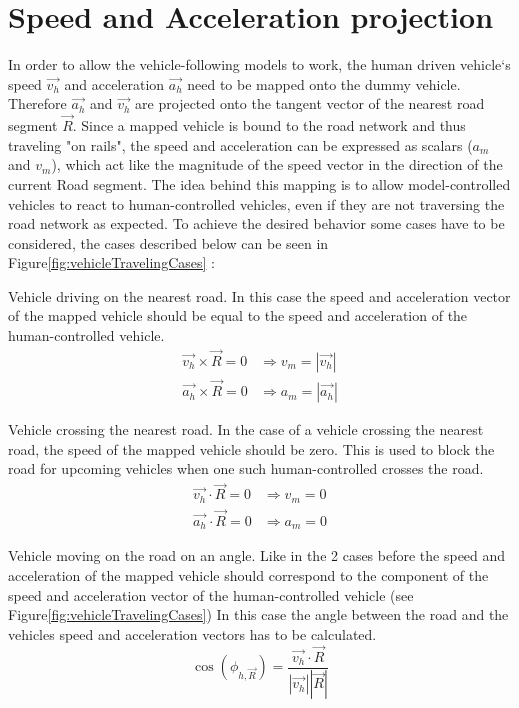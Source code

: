 \section{Speed and Acceleration projection}\label{sec:speed-and-acceleration-projection}
    In order to allow the vehicle-following models to work, the human driven vehicle`s speed $\vec{v_h}$ and acceleration $\vec{a_h}$ need to be mapped onto the dummy vehicle.
    Therefore $\vec{a_h}$ and $\vec{v_h}$ are projected onto the tangent vector of the nearest road segment $\vec{R}$.
    Since a mapped vehicle is bound to the road network and thus traveling "on rails", the speed and acceleration can be expressed as scalars ($a_m$ and $v_m$), which act like the magnitude of the speed vector in the direction of the current Road segment.
    The idea behind this mapping is to allow model-controlled vehicles to react to human-controlled vehicles, even if they are not traversing the road network as expected.
    To achieve the desired behavior some cases have to be considered, the cases described below can be seen in Figure\ref{fig:vehicleTravelingCases} :

    \begin{encase}
        \item Vehicle driving on the nearest road.
        In this case the speed and acceleration vector of the mapped vehicle should be equal to the speed and acceleration of the human-controlled vehicle.
        \begin{align*}
            \vec{v_h} \times \vec{R} = 0 &\Rightarrow v_m = |\vec{v_h}| \\
            \vec{a_h} \times \vec{R} = 0 &\Rightarrow a_m = |\vec{a_h}|
        \end{align*}

        \item Vehicle crossing the nearest road.
        In the case of a vehicle crossing the nearest road, the speed of the mapped vehicle should be zero.
        This is used to block the road for upcoming vehicles when one such human-controlled crosses the road.
        \begin{align*}
            \vec{v_h} \cdot \vec{R} = 0 &\Rightarrow v_m = 0 \\
            \vec{a_h} \cdot \vec{R} = 0 &\Rightarrow a_m = 0
        \end{align*}
        \item Vehicle moving on the road on an angle.
        Like in the 2 cases before the speed and acceleration of the mapped vehicle should correspond to the component of the speed and acceleration vector of the human-controlled vehicle (see Figure\ref{fig:vehicleTravelingCases})
        In this case the angle between the road and the vehicles speed and acceleration vectors has to be calculated.
        \[
            \cos(\phi_{h,\vec{R}}) = \frac{\vec{v_h} \cdot  \vec{R}}{|\vec{v_h}| |\vec{R}|}
        \]
    \end{encase}

